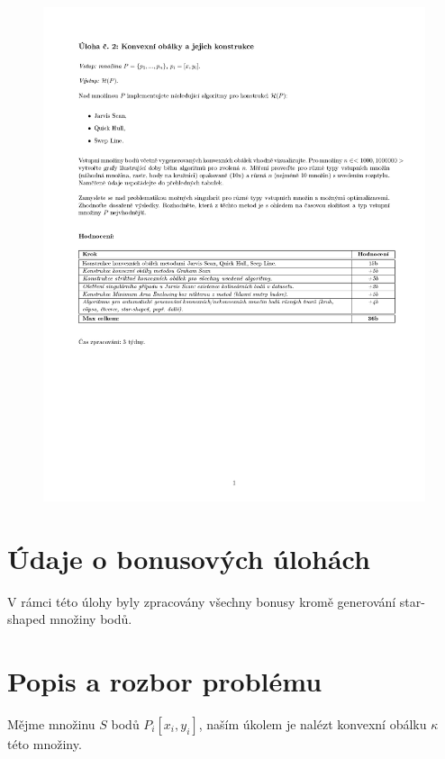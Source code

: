 \documentclass[a4paper, 12pt]{article}
\begin{document}
\begin{figure}[h!]
	\includegraphics[clip, trim=0cm 5cm 0cm 3cm, width=1.0\textwidth]{zadani.pdf}
\end{figure}


\section{Údaje o bonusových úlohách}
V rámci této úlohy byly zpracovány všechny bonusy kromě generování star-shaped množiny bodů.\\



\clearpage

\section{Popis a rozbor problému}

Mějme množinu $S$ bodů $P_i [x_i, y_i]$, naším úkolem je nalézt konvexní obálku $\kappa$ této množiny.\\
  
\end{document}
